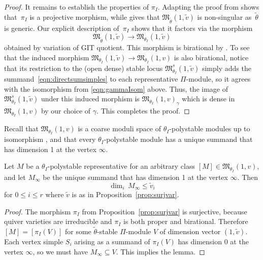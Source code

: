 \begin{proof}
 It remains to establish the properties of $\pi_I$. Adapting the proof from \cite[Lemma~2.4]{bellamy2016symplectic} shows that~$\pi_I$ is a projective morphism, while \cite[Theorem~1.15]{bellamy2016symplectic} gives that $ \mathfrak{M}_{\widetilde{\theta}}(1,\widetilde{v})$ is non-singular as~$\widetilde{\theta}$ is generic. Our explicit description of~$\pi_I$ shows that it factors via the morphism
\begin{equation*}%
\mathfrak{M}_{\widetilde{\theta}}(1,\widetilde{v}) \to \mathfrak{M}_{\theta_I}(1,\widetilde{v})
\end{equation*}
obtained by variation of GIT quotient. This morphism is birational by \cite[Lemma~2.12]{nakajima2009quiver}. To see that the induced morphism $\mathfrak{M}_{\theta_I}(1,\widetilde{v}) \to \mathfrak{M}_{\theta_I}(1,v)$ is also birational, notice that its restriction to the (open dense) stable locus $\mathfrak{M}^s_{\theta_I}(1,\widetilde{v})$ simply adds the summand~\eqref{eqn:directsumsimples} to each representative $\Pi$-module, so it agrees with the isomorphism from \eqref{eqn:gammaIsom} above. Thus, the image of $\mathfrak{M}^s_{\theta_I}(1,\widetilde{v})$ under this induced morphism is $\mathfrak{M}_{\theta_I}(1,v)_\gamma$ which is dense in $\mathfrak{M}_{\theta_I}(1,v)$ by our choice of $\gamma$. This completes the proof.
 \end{proof}

Recall that $\mathfrak{M}_{\theta_I}(1,v)$ is a coarse moduli space of $\theta_I$-polystable modules up to
isomorphism \cite[Proposition 2.9(2)]{nakajima2009quiver}, and that every $\theta_I$-polystable module has a unique summand that has dimension 1 at the vertex $\infty$.
\begin{Lemma}
\label{lem:vwtildev}
Let $M$ be a $\theta_I$-polystable representative for an arbitrary class $[M] \in \mathfrak{M}_{\theta_I}(1,v)$, and let $M_{\infty}$ be the unique summand that has dimension 1 at the vertex $\infty$.
Then
\[ \dim_i\,M_{\infty} \leq \widetilde{v}_i\]
for $0 \leq i \leq r$ where $\widetilde{v}$ is as in Proposition~{\rm \ref{prop:surjvar}}.
\end{Lemma}
\begin{proof}
{The morphism $\pi_I$ from Proposition~\ref{prop:surjvar} is surjective, because quiver varieties are irreducible and $\pi_I$ is both proper and birational. Therefore $[M]=[\pi_I(V)]$ for some $\tilde{\theta}$-stable $\Pi$-module $V$ of dimension vector $(1,\tilde{v})$. Each vertex simple $S_i$ arising as a summand of $\pi_I(V)$} has dimension 0 at the vertex $\infty$, {so }we must have $M_{\infty} \subseteq {V}$. This implies the lemma.
\end{proof}

